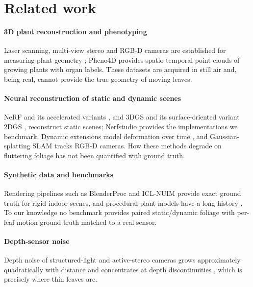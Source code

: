 \documentclass[preprint,11pt,authoryear]{elsarticle}
\begin{document}
\section{Related work}
\paragraph{3D plant reconstruction and phenotyping} Laser scanning, multi-view stereo and RGB-D cameras are established for measuring plant geometry \citep{paulus2019crops3d}; Pheno4D \citep{schunck2021pheno4d} provides spatio-temporal point clouds of growing plants with organ labels. These datasets are acquired in still air and, being real, cannot provide the true geometry of moving leaves.

\paragraph{Neural reconstruction of static and dynamic scenes} NeRF \citep{mildenhall2020nerf} and its accelerated variants \citep{muller2022instant}, and 3DGS \citep{kerbl2023gaussian} and its surface-oriented variant 2DGS \citep{huang20242dgs}, reconstruct static scenes; Nerfstudio \citep{tancik2023nerfstudio} provides the implementations we benchmark. Dynamic extensions model deformation over time \citep{pumarola2021dnerf,luiten2024dynamic,wu20244dgs}, and Gaussian-splatting SLAM \citep{matsuki2024monogs} tracks RGB-D cameras. How these methods degrade on fluttering foliage has not been quantified with ground truth.

\paragraph{Synthetic data and benchmarks} Rendering pipelines such as BlenderProc \citep{denninger2023blenderproc2} and ICL-NUIM \citep{handa2014iclnuim} provide exact ground truth for rigid indoor scenes, and procedural plant models have a long history \citep{prusinkiewicz1990abop,weber1995trees,runions2007space}. To our knowledge no benchmark provides paired static/dynamic foliage with per-leaf motion ground truth matched to a real sensor.

\paragraph{Depth-sensor noise} Depth noise of structured-light and active-stereo cameras grows approximately quadratically with distance and concentrates at depth discontinuities \citep{khoshelham2012kinect,nguyen2012kinectnoise,keselman2017realsense}, which is precisely where thin leaves are.
\end{document}
